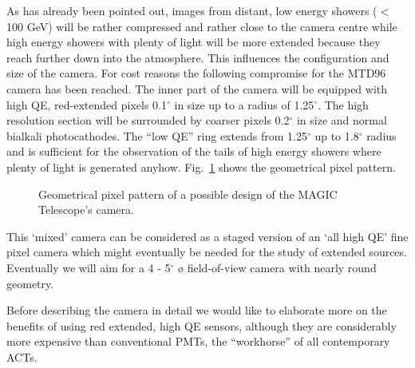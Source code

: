 As has already been pointed out, images from distant, low energy showers
($<$ 100 GeV)
will be rather compressed and rather close to the camera centre while high
energy showers with plenty of light will be more extended because they reach
further down into the atmosphere. This influences the configuration and size
of the camera. For cost reasons the following compromise for the MTD96
camera has been reached. The inner part of the camera will be equipped with
high QE, red-extended pixels 0.1$^\circ$ in size up to a radius of 
1.25$^\circ$. The high resolution section will be surrounded by coarser pixels
0.2$^\circ$ in size and normal bialkali photocathodes. The ``low QE'' ring
extends from 1.25$^\circ$ 
up to 1.8$^\circ$ radius  and is sufficient for the observation of
the tails of
high energy showers where plenty of light is generated anyhow. Fig.~\ref{fig-pattern} 
shows the geometrical pixel pattern.
\begin{figure}[htb]
\leavevmode
\centering
\epsfxsize=12cm
\caption{Geometrical pixel pattern of 
a possible design of the MAGIC Telescope's
camera.}
\vspace{1pc}
\label{fig-pattern}
\end{figure}

This `mixed' camera can be considered as a staged version of an `all high
QE' fine pixel camera which might eventually be needed for the study of
extended sources. Eventually we will aim for a 4 - 5$^\circ$ {\o} field-of-view camera with
nearly round geometry.

Before describing the camera in detail we would like to elaborate more on
the benefits of using red extended, high QE sensors, although they are
considerably more expensive than conventional PMTs, the ``workhorse'' of all
contemporary ACTs.

